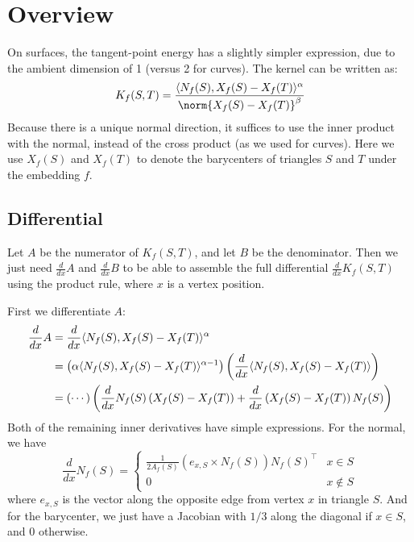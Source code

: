 \documentclass[11pt]{article}
\DeclarePairedDelimiter{\inner}{\langle}{\rangle}
\newcommand{\ddx}{\frac{d}{dx}}
\begin{document}

\thispagestyle{empty}

\section{Overview}

On surfaces, the tangent-point energy has a slightly simpler expression, due to the ambient dimension of 1 (versus 2 for curves). The kernel can be written as:
\begin{equation}
K_f(S, T) = \frac{\inner{N_f(S), X_f(S) - X_f(T)}^{\alpha}}{\norm{X_f(S) - X_f(T)}^{\beta}}
\end{equation}
Because there is a unique normal direction, it suffices to use the inner product with the normal, instead of the cross product (as we used for curves). Here we use $X_f(S)$ and $X_f(T)$ to denote the barycenters of triangles $S$ and $T$ under the embedding $f$.

\subsection{Differential}

Let $A$ be the numerator of $K_f(S, T)$, and let $B$ be the denominator. Then we just need $\ddx A$ and $\ddx B$ to be able to assemble the full differential $\ddx K_f(S, T)$ using the product rule, where $x$ is a vertex position.

First we differentiate $A$:
\begin{align*}
\ddx A &= \ddx \inner{N_f(S), X_f(S) - X_f(T)}^{\alpha}\\
&= \left(\alpha \inner{N_f(S), X_f(S) - X_f(T)}^{\alpha - 1}\right) \left(\ddx \inner{N_f(S), X_f(S) - X_f(T)}\right)\\
&= \left(\cdots\right) \left(\ddx N_f(S) \left(X_f(S) - X_f(T)\right) + \ddx \left(X_f(S) - X_f(T)\right) N_f(S)\right)
\end{align*}
Both of the remaining inner derivatives have simple expressions. For the normal, we have
$$\ddx N_f(S) = \left\{
\begin{array}{lr}
\frac{1}{2 A_f(S)} (e_{x,S} \times N_f(S)) N_f(S)^{\top} & x \in S \\
0 & x \not\in S
\end{array}\right.$$
where $e_{x,S}$ is the vector along the opposite edge from vertex $x$ in triangle $S$. And for the barycenter, we just have a Jacobian with $1/3$ along the diagonal if $x \in S$, and 0 otherwise.
\end{document}
